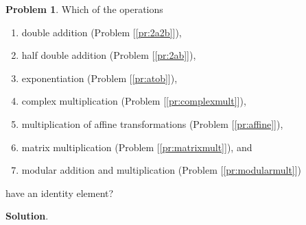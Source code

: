 \documentclass[english,notitlepage,smartquotes]{hgbreport}
\theoremstyle{definition}
\theoremstyle{definition}
\newtheorem{problem}{Problem}
\theoremstyle{remark}
\theoremstyle{definition}
\theoremstyle{plain}
\theoremstyle{definition}
\begin{document}
\begin{problem}
\label{pr:idelem}
Which of the operations
\begin{enumerate}
\item double addition (Problem [\ref{pr:2a2b}]),
\item half double addition (Problem [\ref{pr:2ab}]),
\item exponentiation (Problem [\ref{pr:atob}]),
\item complex multiplication (Problem [\ref{pr:complexmult}]),
\item multiplication of affine transformations (Problem [\ref{pr:affine}]),
\item matrix multiplication (Problem [\ref{pr:matrixmult}]), and
\item modular addition and multiplication (Problem [\ref{pr:modularmult}])
\end{enumerate}
have an identity element?
\end{problem}
\textbf{Solution}.
\end{document}
